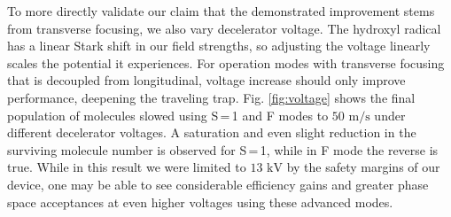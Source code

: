 \documentclass[%
 reprint,
 amsmath,amssymb,
 aps,
prl,
]{revtex4-1}
\begin{document}
To more directly validate our claim that the demonstrated improvement stems from transverse focusing, we also vary decelerator voltage.
The hydroxyl radical has a linear Stark shift in our field strengths, so adjusting the voltage linearly scales the potential it experiences.
For operation modes with transverse focusing that is decoupled from longitudinal, voltage increase should only improve performance, deepening the traveling trap.
Fig. \ref{fig:voltage} shows the final population of molecules slowed using S\,=\,1 and F modes to $50 \text{ m/s}$ under different decelerator voltages.
A saturation and even slight reduction in the surviving molecule number is observed for S\,=\,1, while in F mode the reverse is true.
While in this result we were limited to $13 \text{ kV}$ by the safety margins of our device, one may be able to see considerable efficiency gains and greater phase space acceptances at even higher voltages using these advanced modes.
\end{document}
